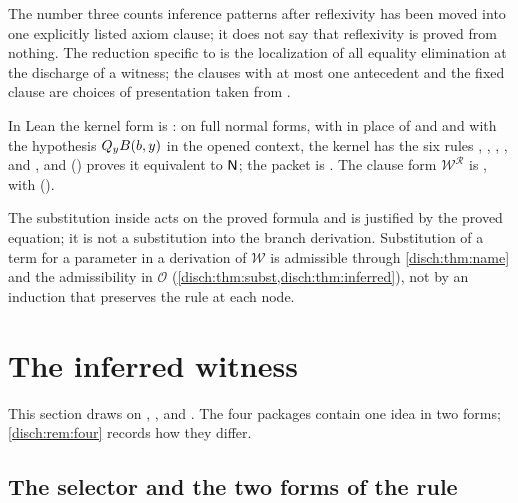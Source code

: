 \begin{remark}
\label{disch:rem:name-lean}
The number three counts inference patterns after reflexivity has been moved
into one explicitly listed axiom clause; it does not say that reflexivity
is proved from nothing. The reduction specific to 
is the localization of all equality elimination at the discharge of a
witness; the clauses with at most one antecedent and the fixed clause are
choices of presentation taken from .

In Lean the kernel form is : on full normal forms, with
 in place of  and  and with the
hypothesis $Q_{y}B(b,y)$ in the opened context, the kernel has the six
rules , , , ,
 and , and 
() proves it equivalent to $\mathsf{N}$; the packet
is . The clause form $\mathcal W^{\mathcal R}$ is
, with  ().
\end{remark}

\begin{remark}
The substitution inside  acts on the proved formula and is
justified by the proved equation; it is not a substitution into the branch
derivation. Substitution of a term for a parameter in a derivation of
$\mathcal W$ is admissible through \cref{disch:thm:name} and the
admissibility in $\mathcal O$ (\cref{disch:thm:subst,disch:thm:inferred}),
not by an induction that preserves the rule at each node.
\end{remark}

\section{The inferred witness}
\label{disch:sec:inferred}

This section draws on ,
,  and
. The four packages contain one idea in two forms;
\cref{disch:rem:four} records how they differ.

\subsection{The selector and the two forms of the rule}


